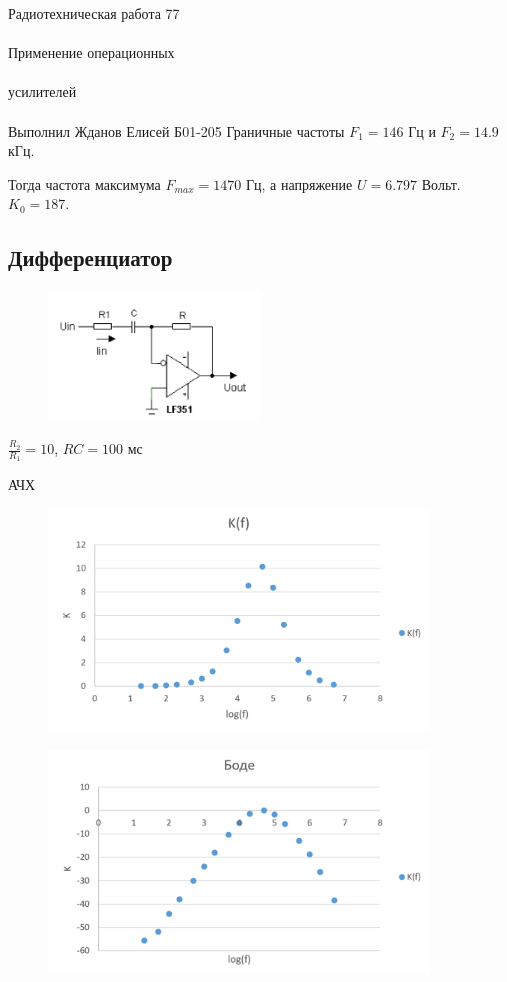 \documentclass{astroedu-lab}
\begin{document}
\begin{problem}{\huge Радиотехническая работа 77\\\\Применение операционных\\\\усилителей\\\\Выполнил Жданов Елисей Б01-205}
Граничные частоты $F_1 = 146$ Гц и $F_2 = 14.9$ кГц.

Тогда частота максимума $F_{max} = 1470$ Гц, а напряжение $U = 6.797$ Вольт. $K_0 = 187$.

\subsection{Дифференциатор}

\begin{figure}[!h]
	\centering
	\includegraphics[width=0.5\textwidth]{dif.png}
	\label{fig:boiler}
\end{figure}

$\frac{R_2}{R_1} = 10$, $RC = 100 \text{ мс}$

АЧХ

\begin{figure}[!h]
	\centering
	\includegraphics[width=0.9\textwidth]{difbd.png}
	\label{fig:boiler}
\end{figure}

\begin{figure}[!h]
	\centering
	\includegraphics[width=0.9\textwidth]{diflog.png}
	\label{fig:boiler}
\end{figure}


\end{problem}
\end{document}
